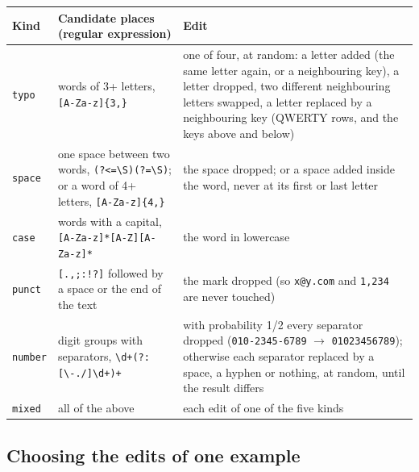\documentclass[10pt,a4paper]{article}
\newcommand{\file}[1]{\texttt{#1}}
\newcommand{\rx}[1]{\mbox{\small\texttt{#1}}}
\begin{document}
\begin{tabularx}{\linewidth}{@{}l>{\raggedright\arraybackslash}p{4.6cm}L@{}}
\toprule
Kind & Candidate places (regular expression) & Edit \\
\midrule
\file{typo} & words of 3+ letters, \rx{[A-Za-z]\{3,\}} & one of four, at random: a letter added (the same letter again, or a neighbouring key), a letter dropped, two different neighbouring letters swapped, a letter replaced by a neighbouring key (QWERTY rows, and the keys above and below) \\
\file{space} & one space between two words, \rx{(?<=\textbackslash S)\textvisiblespace(?=\textbackslash S)}; or a word of 4+ letters, \rx{[A-Za-z]\{4,\}} & the space dropped; or a space added inside the word, never at its first or last letter \\
\file{case} & words with a capital, \rx{[A-Za-z]*[A-Z][A-Za-z]*} & the word in lowercase \\
\file{punct} & \rx{[.,;:!?]} followed by a space or the end of the text & the mark dropped (so \file{x@y.com} and \file{1,234} are never touched) \\
\file{number} & digit groups with separators, \rx{\textbackslash d+(?:[\textvisiblespace\textbackslash -./]\textbackslash d+)+} & with probability 1/2 every separator dropped (\file{010-2345-6789} $\to$ \file{01023456789}); otherwise each separator replaced by a space, a hyphen or nothing, at random, until the result differs \\
\file{mixed} & all of the above & each edit of one of the five kinds \\
\bottomrule
\end{tabularx}

\subsection{Choosing the edits of one example}
\end{document}
